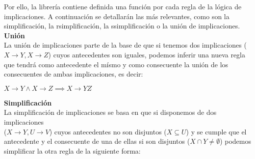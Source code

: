 








Por ello, la librer\'ia contiene definida una funci\'on por cada regla de la l\'ogica de implicaciones. A continuaci\'on se detallar\'an las m\'as relevantes, como son la simplificaci\'on, la rsimplificaci\'on, la ssimplificaci\'on o la uni\'on de implicaciones.\\

\textbf{Uni\'on}\\
La uni\'on de implicaciones parte de la base de que si tenemos dos implicaciones (\(X \to Y , X \to Z\)) cuyos antecedentes son iguales, podemos inferir una nueva regla que tendr\'a como antecedente el m\'ismo y como consecuente la uni\'on de los consecuentes de ambas implicaciones, es decir:

\begin{center}
    \(X \to Y \wedge X \to Z \implies X \to YZ \)
\end{center}


\bigskip
\textbf{Simplificaci\'on}\\
La simplificaci\'on de implicaciones se basa en que si disponemos de dos implicaciones \\ (\(X \to Y , U \to V\)) cuyos antecedentes no son disjuntos (\(X \subseteq U\)) y se cumple que el antecedente y el consecuente de una de ellas si son disjuntos (\(X \cap Y \neq \emptyset\)) podemos simplificar la otra regla de la siguiente forma:

